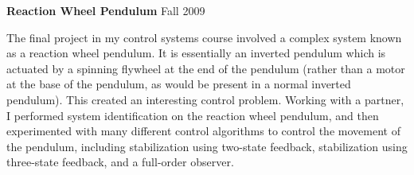 	\textbf{Reaction Wheel Pendulum} \hfill Fall 2009
	\begin{description}
	\item The final project in my control systems course involved a complex
	system known as a reaction wheel pendulum.  It is essentially an inverted
	pendulum which is actuated by a spinning flywheel at the end of the pendulum
	(rather than a motor at the base of the pendulum, as would be present in a
	normal inverted pendulum). This created an interesting control problem.
	Working with a partner, I performed system identification on the reaction
	wheel pendulum, and then experimented with many different control algorithms
	to control the movement of the pendulum, including stabilization using
	two-state feedback, stabilization using three-state feedback, and a full-order
	observer.
	\end{description}

